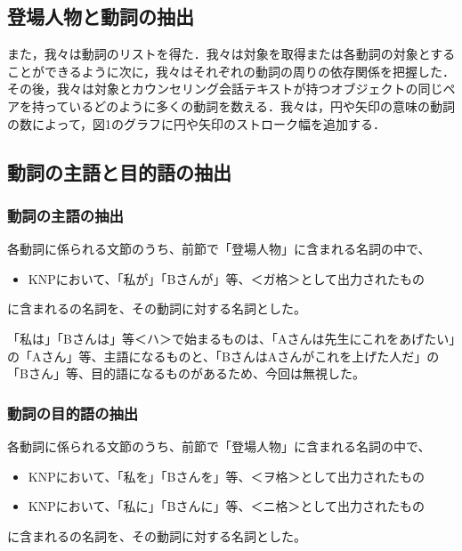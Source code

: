 \documentclass[shuuron]{kuee}
\begin{document}
\subsection{登場人物と動詞の抽出}

また，我々は動詞のリストを得た．我々は対象を取得または各動詞の対象とすることができるように次に，我々はそれぞれの動詞の周りの依存関係を把握した．
その後，我々は対象とカウンセリング会話テキストが持つオブジェクトの同じペアを持っているどのように多くの動詞を数える．我々は，円や矢印の意味の動詞の数によって，図1のグラフに円や矢印のストローク幅を追加する．

\subsection{動詞の主語と目的語の抽出}

\subsubsection{動詞の主語の抽出}


各動詞に係られる文節のうち、前節で「登場人物」に含まれる名詞の中で、

\begin{itemize}

  \item KNPにおいて、「私が」「Bさんが」等、＜ガ格＞として出力されたもの
\end{itemize}
に含まれるの名詞を、その動詞に対する名詞とした。

「私は」「Bさんは」等＜ハ＞で始まるものは、「Aさんは先生にこれをあげたい」の「Aさん」等、主語になるものと、「BさんはAさんがこれを上げた人だ」の「Bさん」等、目的語になるものがあるため、今回は無視した。

\subsubsection{動詞の目的語の抽出}


各動詞に係られる文節のうち、前節で「登場人物」に含まれる名詞の中で、

\begin{itemize}

  \item KNPにおいて、「私を」「Bさんを」等、＜ヲ格＞として出力されたもの
  \item KNPにおいて、「私に」「Bさんに」等、＜ニ格＞として出力されたもの
\end{itemize}
に含まれるの名詞を、その動詞に対する名詞とした。
\end{document}
